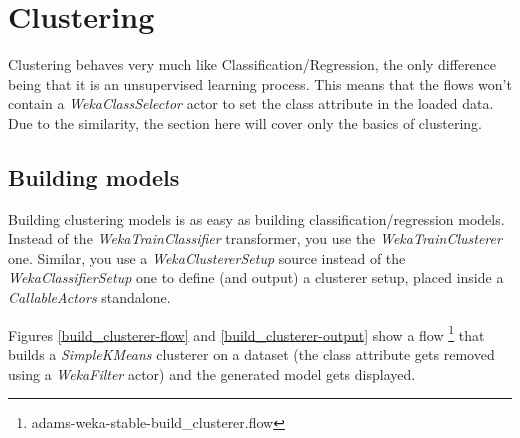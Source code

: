 %

\chapter{Clustering}
\label{clustering}
Clustering behaves very much like Classification/Regression, the only difference
being that it is an unsupervised learning process. This means that the flows
won't contain a \textit{WekaClassSelector} actor to set the class attribute in
the loaded data. Due to the similarity, the section here will cover only
the basics of clustering.

\section{Building models}
Building clustering models is as easy as building classification/regression
models. Instead of the \textit{WekaTrainClassifier} transformer, you use the
\textit{WekaTrainClusterer} one. Similar, you use a \textit{WekaClustererSetup}
source instead of the \textit{WekaClassifierSetup} one to define (and output)
a clusterer setup, placed inside a \textit{CallableActors} standalone.

Figures \ref{build_clusterer-flow} and \ref{build_clusterer-output} show a flow
\footnote{adams-weka-stable-build\_clusterer.flow} that builds a \textit{SimpleKMeans}
clusterer on a dataset (the class attribute gets removed using a
\textit{WekaFilter} actor) and the generated model gets displayed.

